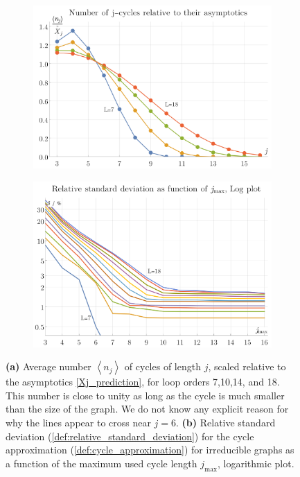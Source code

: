 \documentclass[12pt]{article}
\numberwithin{equation}{section}
\begin{document}
\begin{figure}[htb]
	\centering 
	\begin{subfigure}[b]{.48 \textwidth}
		\includegraphics[width=\linewidth]{figures/cycle_length}
		\subcaption{}
		\label{fig:cycle_length}
	\end{subfigure}
	\begin{subfigure}[b]{.48 \textwidth}
		\includegraphics[width=\linewidth]{figures/cycles_delta}
		\subcaption{}
		\label{fig:cycles_delta}
	\end{subfigure}
	
	\caption{\textbf{(a)} Average number $\left \langle n_j \right \rangle $ of cycles of length $j$, scaled relative to the asymptotics \cref{Xj_prediction}, for loop orders 7,10,14, and 18. This number is close to unity as long as the cycle is much smaller than the size of the graph. We do not know any explicit reason for why the lines appear to cross near $j=6$. \textbf{(b)} Relative standard deviation (\cref{def:relative_standard_deviation}) for the cycle approximation (\cref{def:cycle_approximation}) for irreducible graphs as a function of the maximum used cycle length $j_\text{max}$, logarithmic plot.   }

\end{figure}
\end{document}
